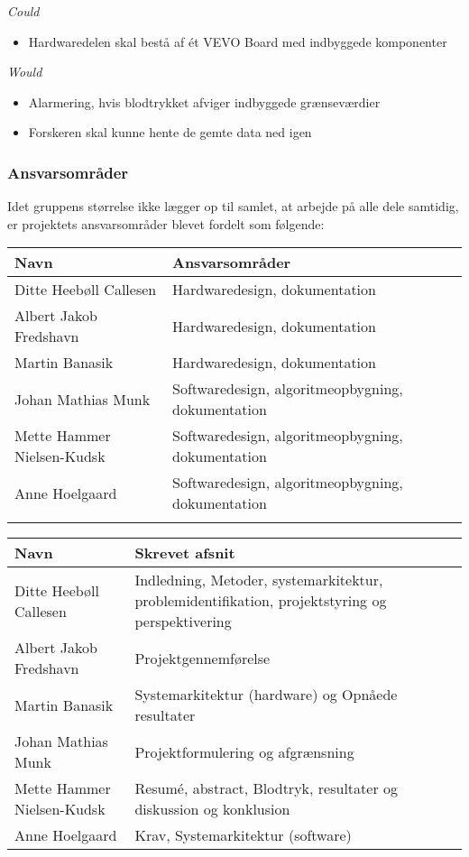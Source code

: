 \textit{Could}
\begin{itemize}
\item Hardwaredelen skal bestå af ét VEVO Board med indbyggede komponenter

\end{itemize} 
\textit{Would}
\begin{itemize}
\item Alarmering, hvis blodtrykket afviger indbyggede grænseværdier
\item Forskeren skal kunne hente de gemte data ned igen
\end{itemize}

\subsubsection{Ansvarsområder}

Idet gruppens størrelse ikke lægger op til samlet, at arbejde på alle dele samtidig, er projektets ansvarsområder blevet fordelt som følgende:

\begin{longtabu} to 
    Navn &    Ansvarsområder &    \\[-1ex]
    \midrule
    Ditte Heebøll Callesen &   Hardwaredesign, dokumentation	&    \\
    Albert Jakob Fredshavn &   Hardwaredesign, dokumentation	&    \\
    Martin Banasik         &   Hardwaredesign, dokumentation	&    \\
    Johan Mathias Munk     &   Softwaredesign, algoritmeopbygning, dokumentation &    \\
    Mette Hammer Nielsen-Kudsk &   Softwaredesign, algoritmeopbygning, dokumentation &    \\
   	Anne Hoelgaard    &   Softwaredesign, algoritmeopbygning, dokumentation	&    \\
\label{version_Systemark}
\end{longtabu}

\begin{longtabu} to 
    Navn &    Skrevet afsnit \\%
    \midrule
    Ditte Heebøll Callesen & Indledning, Metoder, systemarkitektur, problemidentifikation, projektstyring og perspektivering \\
    Albert Jakob Fredshavn &  Projektgennemførelse \\
    Martin Banasik         & Systemarkitektur (hardware) og Opnåede resultater \\
    Johan Mathias Munk     & Projektformulering og afgrænsning  \\
    Mette Hammer Nielsen-Kudsk & Resumé, abstract, Blodtryk, resultater og diskussion og konklusion  \\
   	Anne Hoelgaard   	 	& Krav, Systemarkitektur (software) \\
\end{longtabu}

